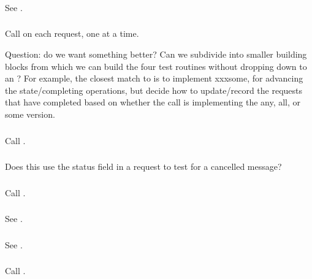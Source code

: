 \documentclass{article}
\begin{document}
\subsubsection{}
See .

\subsubsection{}
Call  on each request, one at a time.

Question: do we want something better?  Can we subdivide
 into smaller building blocks from which we
can build the four test routines without dropping down to an
?  For example, the closest match to  is to
implement xxxsome, for advancing the state/completing operations, but decide
how to update/record the requests that have completed based on whether the
call is implementing the any, all, or some version.

\subsubsection{}
Call .

\subsubsection{}
Does this use the status field in a request to test for a cancelled message?

\subsubsection{}
Call .

\subsubsection{}
See .

\subsubsection{}
See .

\subsubsection{}
Call .
\end{document}
